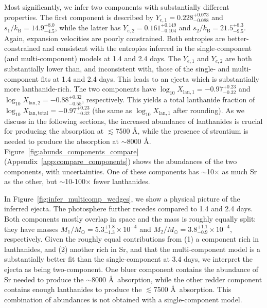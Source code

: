 \documentclass[twocolumn,twocolappendix]{aastex63}
\begin{document}
Most significantly, we infer two components with substantially different properties. The first component is described by $Y_{e,1} = 0.228^{+0.073}_{-0.088}$ and $s_1 / k_{\mathrm{B}} = 14.9^{+8.0}_{-4.5}$, while the latter has $Y_{e,2} = 0.161^{+0.149}_{-0.104}$ and $s_2 / k_{\mathrm{B}} = 21.5^{+8.3}_{-9.5}$. Again, expansion velocities are poorly constrained. Both entropies are better-constrained and consistent with the entropies inferred in the single-component (and multi-component) models at 1.4 and 2.4 days. The $Y_{e,1}$ and $Y_{e,2}$ are both substantially lower than, and inconsistent with, those of the single- and multi- component fits at 1.4 and 2.4 days. This leads to an ejecta which is substantially more lanthanide-rich. The two components have $\log_{10} X_{\mathrm{lan},1} = -0.97^{+0.23}_{-0.32}$ and $\log_{10} X_{\mathrm{lan},2} = -0.88^{+0.32}_{-0.55}$, respectively. This yields a total lanthanide fraction of $\log_{10} X_{\mathrm{lan,total}} = -0.97^{+0.23}_{-0.32}$ (the same as $\log_{10} X_{\mathrm{lan},1}$ after rounding). As we discuss in the following sections, the increased abundance of lanthanides is crucial for producing the absorption at $\lesssim$7500 \AA, while the presence of strontium is needed to produce the absorption at $\sim$8000 \AA. Figure~\ref{fig:abunds_components_compare} (Appendix~\ref{app:compare_components}) shows the abundances of the two components, with uncertainties. One of these components has $\sim$10$\times$ as much Sr as the other, but $\sim$10-100$\times$ fewer lanthanides. 

In Figure~\ref{fig:infer_multicomp_wedges}, we show a physical picture of the inferred ejecta. The photosphere further recedes compared to 1.4 and 2.4 days. Both components mostly overlap in space and the mass is roughly equally split: they have  masses $M_1/M_{\odot} = 5.3^{+1.8}_{-1.3} \times 10^{-4}$ and $M_2/M_{\odot} = 3.8^{+1.1}_{-0.9} \times 10^{-4}$, respectively.  Given the roughly equal contributions from (1) a component rich in lanthanides, and (2) another rich in Sr, and that the multi-component model is a substantially better fit than the single-component at 3.4 days, we interpret the ejecta as being two-component. One bluer component contains the abundance of Sr needed to produce the $\sim$8000 \AA~absorption, while the other redder component contains enough lanthanides to produce the $\lesssim$7500 \AA~absorption. This combination of abundances is not obtained with a single-component model.
\end{document}
